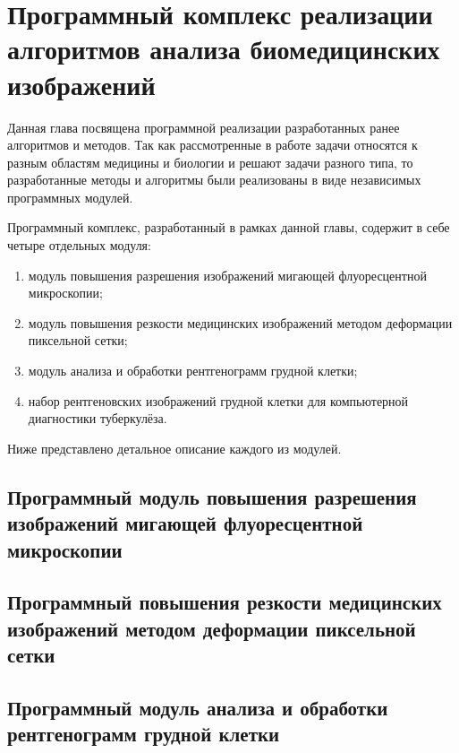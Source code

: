
\chapter{Программный комплекс реализации алгоритмов анализа биомедицинских изображений}\label{ch:ch4}

Данная глава посвящена программной реализации разработанных ранее алгоритмов и методов. Так как рассмотренные в работе задачи относятся к разным областям медицины и биологии и решают задачи разного типа, то разработанные методы и алгоритмы были реализованы в виде независимых программных модулей.

Программный комплекс, разработанный в рамках данной главы, содержит в себе четыре отдельных модуля:

\begin{enumerate}[beginpenalty=10000]
	\item модуль повышения разрешения изображений мигающей флуоресцентной микроскопии;
	
	\item модуль повышения резкости медицинских изображений методом деформации пиксельной сетки;
	
	\item модуль анализа и обработки рентгенограмм грудной клетки;
	
	\item набор рентгеновских изображений грудной клетки для компьютерной диагностики туберкулёза.
\end{enumerate}

Ниже представлено детальное описание каждого из модулей.
 
\section{Программный модуль повышения разрешения изображений мигающей флуоресцентной микроскопии}

\section{Программный повышения резкости медицинских изображений методом деформации пиксельной сетки}

\section{Программный модуль анализа и обработки рентгенограмм грудной клетки}


